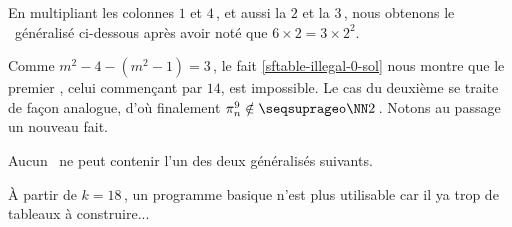 En multipliant les colonnes $1$ et $4$\,, et aussi la $2$ et la $3$\,, nous obtenons le \sftab\ généralisé ci-dessous après avoir noté que $6 \times 2 = 3 \times 2^2$.

\begin{center}
\end{center}


Comme $m^2 - 4 - ( m^2 - 1 ) = 3$\,, le fait \ref{sftable-illegal-0-sol} nous montre que le premier \sftab[], celui commençant par $14$, est impossible.
Le cas du deuxième se traite de façon analogue, d'où finalement $\consprod<9> \notin \NNsquare$\,. Notons au passage un nouveau fait.


\begin{fact} \label{no-sftab-1.6.*.2.3}
	Aucun \sftab\ ne peut contenir l'un des deux \sftab[x] généralisés suivants.
	\begin{center}
	\end{center} 
\end{fact}




À partir de $k = 18$\,, un programme basique n'est plus utilisable car il ya trop de tableaux à construire...
